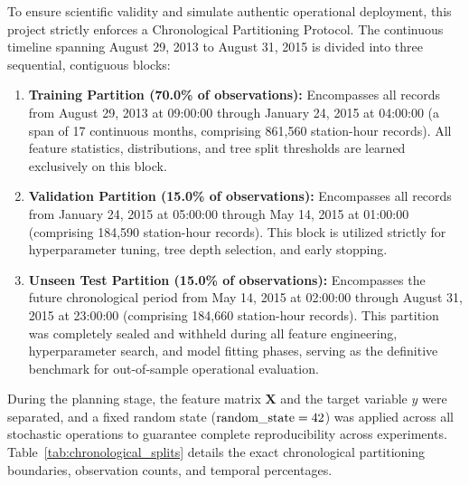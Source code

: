 \documentclass[12pt, a4paper]{article}
\renewcommand{\_}{\textunderscore\allowbreak}
\begin{document}
To ensure scientific validity and simulate authentic operational deployment, this project strictly enforces a Chronological Partitioning Protocol. The continuous timeline spanning August 29, 2013 to August 31, 2015 is divided into three sequential, contiguous blocks:
\begin{enumerate}
    \item \textbf{Training Partition (70.0\% of observations):} Encompasses all records from August 29, 2013 at 09:00:00 through January 24, 2015 at 04:00:00 (a span of 17 continuous months, comprising 861,560 station-hour records). All feature statistics, distributions, and tree split thresholds are learned exclusively on this block.
    \item \textbf{Validation Partition (15.0\% of observations):} Encompasses all records from January 24, 2015 at 05:00:00 through May 14, 2015 at 01:00:00 (comprising 184,590 station-hour records). This block is utilized strictly for hyperparameter tuning, tree depth selection, and early stopping.
    \item \textbf{Unseen Test Partition (15.0\% of observations):} Encompasses the future chronological period from May 14, 2015 at 02:00:00 through August 31, 2015 at 23:00:00 (comprising 184,660 station-hour records). This partition was completely sealed and withheld during all feature engineering, hyperparameter search, and model fitting phases, serving as the definitive benchmark for out-of-sample operational evaluation.
\end{enumerate}

During the planning stage, the feature matrix $\mathbf{X}$ and the target variable $y$ were separated, and a fixed random state ($\text{random\_state} = 42$) was applied across all stochastic operations to guarantee complete reproducibility across experiments. Table~\ref{tab:chronological_splits} details the exact chronological partitioning boundaries, observation counts, and temporal percentages.
\end{document}
